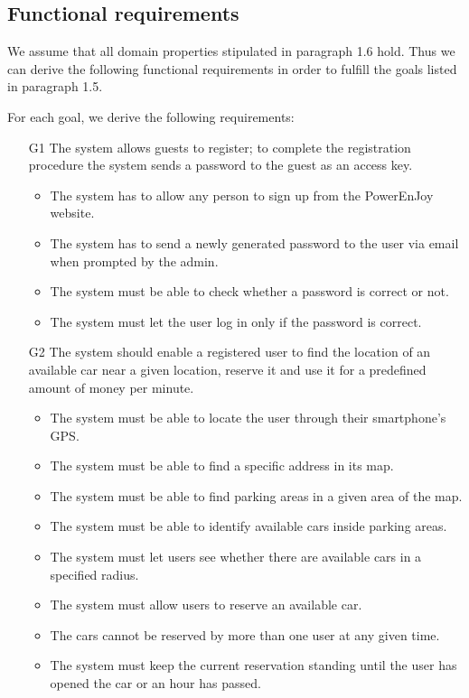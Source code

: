 
\subsection{Functional requirements}
We assume that all domain properties stipulated in paragraph 1.6 hold. Thus we can derive the following functional requirements in order to fulfill the goals listed in paragraph 1.5.

For each goal, we derive the following requirements:



\begin{itemize}
	\item [G1] The system allows guests to register; to complete the registration procedure the system sends a password to the guest as an access key. 
		\begin{itemize}
			\item The system has to allow any person to sign up from the PowerEnJoy website.
			\item The system has to send a newly generated password to the user via email when prompted by the admin.
			\item The system must be able to check whether a password is correct or not.
			\item The system must let the user log in only if the password is correct. 		
		\end{itemize}
	\item [G2] The system should enable a registered user to find the location of an available car near a given location, reserve it and use it for a predefined amount of money per minute. 
		\begin{itemize}
			\item The system must be able to locate the user through their smartphone's GPS.
			\item The system must be able to find a specific address in its map. %
			\item The system must be able to find parking areas in a given area of the map. 
			\item The system must be able to identify available cars inside parking areas.
			\item The system must let users see whether there are available cars in a specified radius. 
			\item The system must allow users to reserve an available car.
			\item The cars cannot be reserved by more than one user at any given time.
			\item The system must keep the current reservation standing until the user has opened the car or an hour has passed.

\end{itemize}
\end{itemize}
